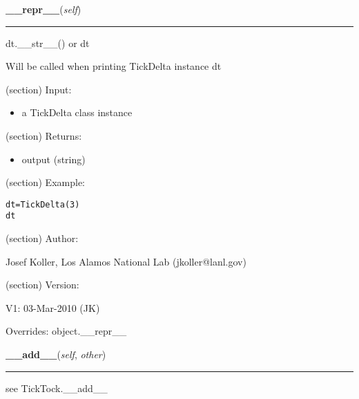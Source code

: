 \hspace{.8\funcindent}\begin{boxedminipage}{\funcwidth}

    \raggedright \textbf{\_\_repr\_\_}(\textit{self})

    \vspace{-1.5ex}

    \rule{\textwidth}{0.5\fboxrule}
\setlength{\parskip}{2ex}
    dt.\_\_str\_\_() or dt

    Will be called when printing TickDelta instance dt

    (section) Input:

      \begin{itemize}
      \setlength{\parskip}{0.6ex}
        \item a TickDelta class instance

      \end{itemize}

    (section) Returns:

      \begin{itemize}
      \setlength{\parskip}{0.6ex}
        \item output (string)

      \end{itemize}

    (section) Example:

\begin{alltt}
\pysrcprompt{{\textgreater}{\textgreater}{\textgreater} }dt = TickDelta(3)
\pysrcprompt{{\textgreater}{\textgreater}{\textgreater} }dt
\end{alltt}
    (section) Author:

      Josef Koller, Los Alamos National Lab (jkoller@lanl.gov)

    (section) Version:

      V1: 03-Mar-2010 (JK)

\setlength{\parskip}{1ex}
      Overrides: object.\_\_repr\_\_

    \end{boxedminipage}

    \label{spacepy:spacetime:TickDelta:__add__}

    \vspace{0.5ex}

\hspace{.8\funcindent}\begin{boxedminipage}{\funcwidth}

    \raggedright \textbf{\_\_add\_\_}(\textit{self}, \textit{other})

    \vspace{-1.5ex}

    \rule{\textwidth}{0.5\fboxrule}
\setlength{\parskip}{2ex}
    see TickTock.\_\_add\_\_

\setlength{\parskip}{1ex}
    \end{boxedminipage}

